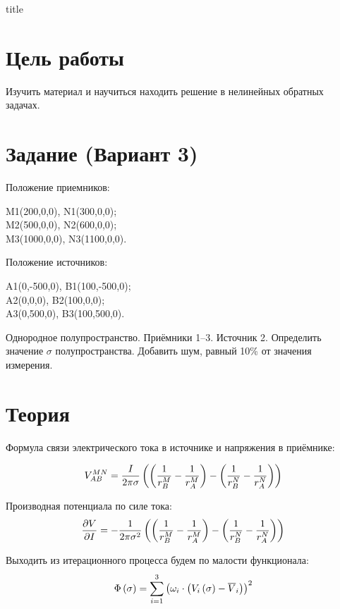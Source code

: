 \documentclass[pdftex, a4paper, 14pt]{extreport}
\begin{document}
{title} 

\section*{Цель работы}
Изучить материал и научиться находить решение в нелинейных обратных задачах.

\section*{Задание (Вариант 3)}
Положение приемников:
\begin{center}
    M1(200,0,0), N1(300,0,0); \\
    M2(500,0,0), N2(600,0,0); \\
    M3(1000,0,0), N3(1100,0,0). \\
\end{center}

Положение источников:
\begin{center}
    A1(0,-500,0), B1(100,-500,0); \\
    A2(0,0,0), B2(100,0,0); \\
    A3(0,500,0), B3(100,500,0). \\
\end{center}

Однородное полупространство. Приёмники 1–3. Источник 2. 
Определить значение $\sigma$ полупространства. Добавить шум, равный
10\% от значения измерения. 

\section*{Теория}
Формула связи электрического тока в источнике и напряжения в приёмнике:

\begin{equation*}
    V_{AB}^{MN} = \frac{I}{2\pi\sigma} \left ({\left ({\frac{1}{r_B^M} - \frac{1}{r_A^M}} \right ) - \left ({\frac{1}{r_B^N} - \frac{1}{r_A^N}} \right )} \right )
\end{equation*}

Производная потенциала по силе тока:
\begin{equation*}
    \frac{\partial V}{\partial I} = -\frac{1}{2\pi\sigma^2} \left ({\left ({\frac{1}{r_B^M} - \frac{1}{r_A^M}} \right ) - \left ({\frac{1}{r_B^N} - \frac{1}{r_A^N}} \right )} \right )
\end{equation*}

Выходить из итерационного процесса будем по малости функционала:
\begin{equation*}
    \Phi\left ({\sigma} \right ) = \displaystyle\sum\limits_{i=1}^3\left ({\omega_i \cdot \left ({V_i\left ({\sigma} \right ) - \overline V_i} \right )} \right )^2
\end{equation*}
\end{document}
